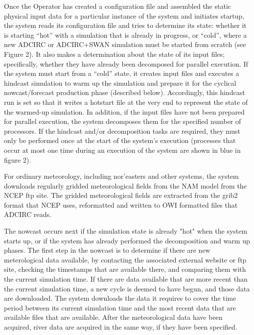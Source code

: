 \documentclass[12pt]{article}
\begin{document}
Once the Operator has created a configuration file and assembled the 
static physical input data for a particular instance of the system 
and initiates startup, the system reads its configuration file and 
tries to determine its state: whether it is starting “hot” with a 
simulation that is already in progress, or “cold”, where a new 
ADCIRC or ADCIRC+SWAN simulation must be started from scratch (see 
Figure 2). It also makes a determination about the state of its 
input files; specifically, whether they have already been decomposed 
for parallel execution. If the system must start from a “cold” 
state, it creates input files and executes a hindcast simulation to 
warm up the simulation and prepare it for the cyclical 
nowcast/forecast production phase (described below). Accordingly, 
this hindcast run is set so that it writes a hotstart file at the 
very end to represent the state of the warmed-up simulation. In 
addition, if the input files have not been prepared for parallel 
execution, the system decomposes them for the specified number of 
processors. If the hindcast and/or decomposition tasks are required, 
they must only be performed once at the start of the system's 
execution (processes that occur at most one time during an execution 
of the system are shown in blue in figure 2).

For ordinary meteorology, including nor'easters and other 
systems, the system downloads regularly gridded meteorological 
fields from the NAM model from the NCEP ftp site. The gridded 
meteorological fields are extracted from the grib2 format that NCEP 
uses, reformatted and written to OWI formatted files that ADCIRC 
reads. 

The nowcast occurs next if the simulation state is already "hot" 
when the system starts up, or if the system has already performed 
the decomposition and warm up phases. The first step in the nowcast 
is to determine if there are new meterological data available, by 
contacting the associated external website or ftp site, checking the 
timestamps that are available there, and comparing them with the 
current simulation time. If there are data available that are more 
recent than the current simulation time, a new cycle is deemed to 
have begun, and those data are downloaded. The system downloads the 
data it requires to cover the time period between its current 
simulation time and the most recent data that are available files 
that are available. After the meteorological data have been 
acquired, river data are acquired in the same way, if they have been 
specified. 
\end{document}
